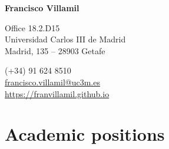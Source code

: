 \documentclass[a4paper, 12pt]{article}
\begin{document}

\begin{center}
{\bfseries\Large Francisco Villamil}
\end{center}

\vspace{0pt}

\noindent
\begin{minipage}[t]{0.47\textwidth}\small
\flushright
	Office 18.2.D15\\
	Universidad Carlos III de Madrid\\
	Madrid, 135 -- 28903 Getafe\\
\end{minipage}\hfill
\begin{minipage}[t]{0.47\textwidth}\small
	 \hspace{5pt} (+34) 91 624 8510\\
	 \hspace{5pt} \href{mailto:francisco.villamil@uc3m.es}{francisco.villamil@uc3m.es}\\
	 \hspace{5pt} \href{https://franvillamil.github.io}{https://franvillamil.github.io}\\
\end{minipage}


\section*{Academic positions}
\end{document}
